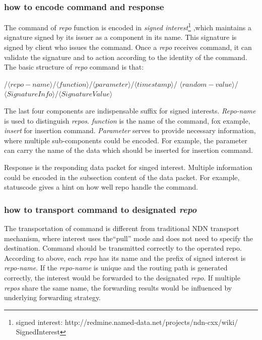 \documentclass[conference]{IEEEtran}
\begin{document}
\subsubsection{how to encode command and response}

The command of \emph{repo} function is encoded in \emph{signed interest}\footnote{signed interest: http://redmine.named-data.net/projects/ndn-cxx/wiki/
SignedInterest} ,which maintains a signature signed by its issuer as a component in its name. This signature is signed by client who issues the command. Once a \emph{repo} receives command, it can validate the signature and to action according to the identity of the command. The basic structure of \emph{repo} command is that:

/$\langle repo-name\rangle$/$\langle function\rangle$/$\langle parameter\rangle$/$\langle timestamp\rangle$/
$\langle random-value\rangle$/$\langle SignatureInfo\rangle$/$\langle SignatureValue\rangle$

The last four components are indispensable suffix for signed interests. \emph{Repo-name} is used to distinguish \emph{repos}. \emph{function} is the name of the command, fox example, \emph{insert} for insertion command. \emph{Parameter} serves to provide necessary information, where multiple sub-components could be encoded. For example, the parameter can carry the name of the data which should be inserted for insertion command.

Response is the responding data packet for singed interest. Multiple information could be encoded in the subsection content of the data packet. For example, statuscode gives a hint on how well repo handle the command.

\subsubsection{how to transport command to designated \emph{repo}}

The transportation of command is different from traditional NDN transport mechanism, where interest uses the``pull'' mode and does not need to specify the destination. Command should be transmitted correctly to the operated repo. According to above, each \emph{repo} has its name and the prefix of signed interest is \emph{repo-name}. If the \emph{repo-name} is unique and the routing path is generated correctly, the interest would be forwarded to the designated \emph{repo}. If multiple \emph{repos} share the same name, the forwarding results would be influenced by underlying forwarding strategy.
\end{document}
